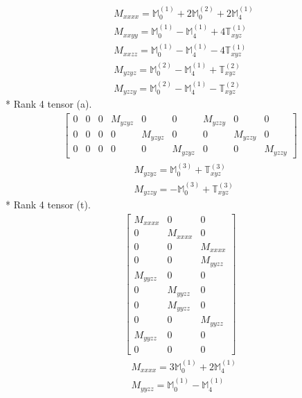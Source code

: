\documentclass[fleqn,8pt,landscape]{jsarticle}
\begin{document}
\begin{align*}
& M_{xxxx} = \mathbb{M}_{0}^{(1)} + 2 \mathbb{M}_{0}^{(2)} + 2 \mathbb{M}_{4}^{(1)} \\
& M_{xxyy} = \mathbb{M}_{0}^{(1)} - \mathbb{M}_{4}^{(1)} + 4 \mathbb{T}_{xyz}^{(1)} \\
& M_{xxzz} = \mathbb{M}_{0}^{(1)} - \mathbb{M}_{4}^{(1)} - 4 \mathbb{T}_{xyz}^{(1)} \\
& M_{yzyz} = \mathbb{M}_{0}^{(2)} - \mathbb{M}_{4}^{(1)} + \mathbb{T}_{xyz}^{(2)} \\
& M_{yzzy} = \mathbb{M}_{0}^{(2)} - \mathbb{M}_{4}^{(1)} - \mathbb{T}_{xyz}^{(2)}
\end{align*}
* Rank 4 tensor (a).
\begin{align*}
\begin{bmatrix} 0 & 0 & 0 & M_{yzyz} & 0 & 0 & M_{yzzy} & 0 & 0 \\ 0 & 0 & 0 & 0 & M_{yzyz} & 0 & 0 & M_{yzzy} & 0 \\ 0 & 0 & 0 & 0 & 0 & M_{yzyz} & 0 & 0 & M_{yzzy} \end{bmatrix}
\end{align*}
\begin{align*}
& M_{yzyz} = \mathbb{M}_{0}^{(3)} + \mathbb{T}_{xyz}^{(3)} \\
& M_{yzzy} = - \mathbb{M}_{0}^{(3)} + \mathbb{T}_{xyz}^{(3)}
\end{align*}
* Rank 4 tensor (t).
\begin{align*}
\begin{bmatrix} M_{xxxx} & 0 & 0 \\ 0 & M_{xxxx} & 0 \\ 0 & 0 & M_{xxxx} \\ 0 & 0 & M_{yyzz} \\ M_{yyzz} & 0 & 0 \\ 0 & M_{yyzz} & 0 \\ 0 & M_{yyzz} & 0 \\ 0 & 0 & M_{yyzz} \\ M_{yyzz} & 0 & 0 \\ 0 & 0 & 0 \end{bmatrix}
\end{align*}
\begin{align*}
& M_{xxxx} = 3 \mathbb{M}_{0}^{(1)} + 2 \mathbb{M}_{4}^{(1)} \\
& M_{yyzz} = \mathbb{M}_{0}^{(1)} - \mathbb{M}_{4}^{(1)}
\end{align*}
\end{document}
